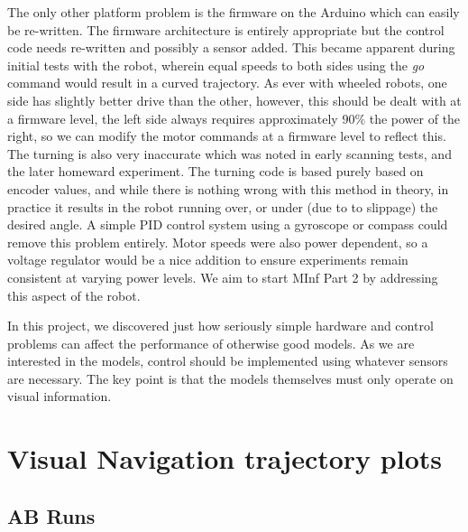 \documentclass[a4paper,11pt,twoside,openright]{article}
\let\oldsection\section
\def\section{\cleardoublepage\oldsection}
\begin{document}
The only other platform problem is the firmware on the Arduino
which can easily be re-written. The firmware architecture is entirely appropriate but the control code
needs re-written and possibly a sensor added. This became apparent during initial tests with the robot, wherein
equal speeds to both sides using the \textit{go} command would result in a curved trajectory. As ever with
wheeled robots, one side has slightly better drive than the other, however, this should be dealt with at a
firmware level, the left side always requires approximately $90\%$ the power of the right, so we can
modify the motor commands at a firmware level to reflect this. The turning is also very inaccurate which
was noted in early scanning tests, and the later homeward experiment. The turning code is based purely based on
encoder values, and while there is nothing wrong with this method in theory, in practice it results in the robot
running over, or under (due to to slippage) the desired angle. A simple PID control system using a gyroscope
or compass could remove this problem entirely. Motor speeds were also power dependent, so a voltage regulator
would be a nice addition to ensure experiments remain consistent at varying power levels. We aim to start
MInf Part 2 by addressing this aspect of the robot.
\newline

In this project, we discovered just how seriously simple hardware and 
control problems can affect the performance of otherwise good models. As we are interested in the models,
control should be implemented using whatever sensors are necessary. The key point is that the models themselves
must only operate on visual information. 
\newpage



\newpage

\appendix
\section{Visual Navigation trajectory plots} \label{app:plots}

\subsection{AB Runs}
\end{document}
